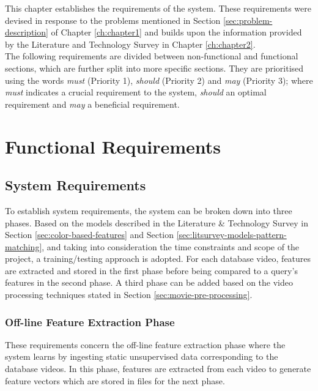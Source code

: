 This chapter establishes the requirements of the system. These requirements were devised in response to the problems mentioned in Section \ref{sec:problem-description} of Chapter \ref{ch:chapter1} and builds upon the information provided by the Literature and Technology Survey in Chapter \ref{ch:chapter2}.\\

The following requirements are divided between non-functional and functional sections, which are further split into more specific sections. They are prioritised using the words \textit{must} (Priority 1), \textit{should} (Priority 2) and \textit{may} (Priority 3); where \textit{must} indicates a crucial requirement to the system, \textit{should} an optimal requirement and \textit{may} a beneficial requirement.

\section{Functional Requirements}

\subsection{System Requirements}

To establish system requirements, the system can be broken down into three phases. Based on the models described in the Literature \& Technology Survey in Section \ref{sec:color-based-features} and Section \ref{sec:litsurvey-models-pattern-matching}, and taking into consideration the time constraints and scope of the project, a training/testing approach is adopted. For each database video, features are extracted and stored in the first phase before being compared to a query's features in the second phase. A third phase can be added based on the video processing techniques stated in Section \ref{sec:movie-pre-processing}.

\subsubsection{Off-line Feature Extraction Phase}

These requirements concern the off-line feature extraction phase where the system learns by ingesting static unsupervised data corresponding to the database videos. In this phase, features are extracted from each video to generate feature vectors which are stored in files for the next phase.

